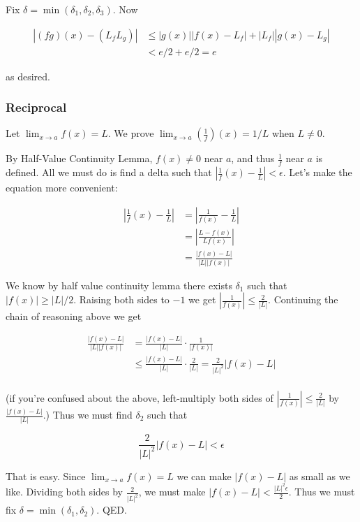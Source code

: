 \vs

Fix $\delta=\min(\delta_1, \delta_2, \delta_3)$. Now

\begin{align*}
    |(fg)(x)-(L_fL_g)|&\leq |g(x)||f(x)-L_f|+|L_f||g(x)-L_g|\\
    &<e/2+e/2=e
\end{align*}

as desired.

\subsubsection*{Reciprocal}

Let $\lim_{x\to a}f(x)=L$. We prove $\lim_{x\to a}\left(\frac{1}{f}\right)(x)=1/L$ when $L\neq 0$.

\vs

By Half-Value Continuity Lemma, $f(x)\neq 0$ near $a$, and thus
$\frac{1}{f}$ near $a$ is defined. All we must do is find a delta such
that $\left|\frac{1}{f}(x)-\frac{1}{L}\right|<\epsilon$. Let's make the
equation more convenient:

\begin{align*}
    \left|\frac{1}{f}(x)-\frac{1}{L}\right|&=\left|\frac{1}{f(x)}-\frac{1}{L}\right|\\
    &=\left|\frac{L-f(x)}{Lf(x)}\right|\\
    &=\frac{|f(x)-L|}{|L||f(x)|}
\end{align*}

We know by half value continuity lemma there exists $\delta_1$ such that
$|f(x)|\geq |L|/2$. Raising both sides to $-1$ we get
$|\frac{1}{f(x)}|\leq \frac{2}{|L|}$. Continuing the chain of reasoning
above we get

\begin{align*}
    \frac{|f(x)-L|}{|L||f(x)|}&=\frac{|f(x)-L|}{|L|}\cdot\frac{1}{|f(x)|}\\
    &\leq\frac{|f(x)-L|}{|L|}\cdot\frac{2}{|L|}=\frac{2}{|L|^2}|f(x)-L|\\
\end{align*}

(if you're confused about the above, left-multiply both sides of
$|\frac{1}{f(x)}|\leq \frac{2}{|L|}$ by $\frac{|f(x)-L|}{|L|}$.) Thus we
must find $\delta_2$ such that

\[\frac{2}{|L|^2}|f(x)-L|<\epsilon\]

That is easy. Since $\lim_{x\to a}f(x)=L$ we can make $|f(x)-L|$ as
small as we like. Dividing both sides by $\frac{2}{|L|^2}$, we must
make $|f(x)-L|<\frac{|L|^2\epsilon}{2}$. Thus we must fix
$\delta=\min(\delta_1, \delta_2)$. QED.

